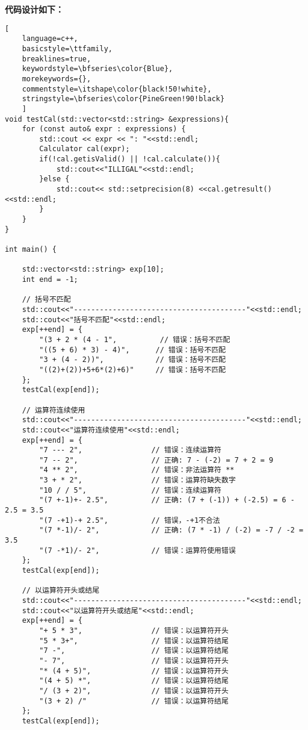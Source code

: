 \documentclass[UTF8]{ctexart}
\begin{document}
\textbf{代码设计如下：}
\begin{lstlisting}[ 
    language=c++,
    basicstyle=\ttfamily,
    breaklines=true,
    keywordstyle=\bfseries\color{Blue}, 
    morekeywords={}, 
    commentstyle=\itshape\color{black!50!white},
    stringstyle=\bfseries\color{PineGreen!90!black} 
    ]
void testCal(std::vector<std::string> &expressions){
    for (const auto& expr : expressions) {
        std::cout << expr << ": "<<std::endl;
        Calculator cal(expr);
        if(!cal.getisValid() || !cal.calculate()){
            std::cout<<"ILLIGAL"<<std::endl;
        }else {
            std::cout<< std::setprecision(8) <<cal.getresult()<<std::endl;
        }
    }
}

int main() {
    
    std::vector<std::string> exp[10];
    int end = -1;

    // 括号不匹配
    std::cout<<"----------------------------------------"<<std::endl;
    std::cout<<"括号不匹配"<<std::endl;
    exp[++end] = {  
        "(3 + 2 * (4 - 1",          // 错误：括号不匹配
        "((5 + 6) * 3) - 4)",      // 错误：括号不匹配
        "3 + (4 - 2))",            // 错误：括号不匹配
        "((2)+(2))+5+6*(2)+6)"     // 错误：括号不匹配
    };
    testCal(exp[end]);

    // 运算符连续使用
    std::cout<<"----------------------------------------"<<std::endl;
    std::cout<<"运算符连续使用"<<std::endl;
    exp[++end] = {  
        "7 --- 2",                // 错误：连续运算符
        "7 -- 2",                 // 正确: 7 - (-2) = 7 + 2 = 9
        "4 ** 2",                 // 错误：非法运算符 **
        "3 + * 2",                // 错误：运算符缺失数字
        "10 / / 5",               // 错误：连续运算符
        "(7 +-1)+- 2.5",          // 正确: (7 + (-1)) + (-2.5) = 6 - 2.5 = 3.5
        "(7 -+1)-+ 2.5",          // 错误，-+1不合法
        "(7 *-1)/- 2",            // 正确: (7 * -1) / (-2) = -7 / -2 = 3.5
        "(7 -*1)/- 2",            // 错误：运算符使用错误
    };
    testCal(exp[end]);

    // 以运算符开头或结尾
    std::cout<<"----------------------------------------"<<std::endl;
    std::cout<<"以运算符开头或结尾"<<std::endl;
    exp[++end] = { 
        "+ 5 * 3",                // 错误：以运算符开头
        "5 * 3+",                 // 错误：以运算符结尾
        "7 -",                    // 错误：以运算符结尾
        "- 7",                    // 错误：以运算符开头
        "* (4 + 5)",              // 错误：以运算符开头
        "(4 + 5) *",              // 错误：以运算符结尾
        "/ (3 + 2)",              // 错误：以运算符开头
        "(3 + 2) /"               // 错误：以运算符结尾
    };
    testCal(exp[end]);


\end{lstlisting}
\end{document}
